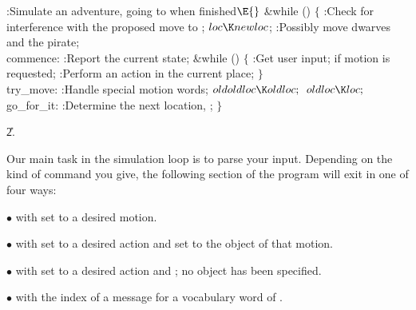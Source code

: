 \Y\B\4:Simulate an adventure, going to  when finished\X${}%
\E{}$\6
\&{while} ()\5
${}\{{}$\1\6
:Check for interference with the proposed move to \X;\6
${}\\{loc}\K\\{newloc}{}$;\6
:Possibly move dwarves and the pirate\X;\6
\4\\{commence}:\5
:Report the current state\X;\6
\&{while} ()\5
${}\{{}$\1\6
:Get user input;  if motion is requested\X;\6
:Perform an action in the current place\X;\6
\4${}\}{}$\2\6
\4\\{try\_move}:\5
:Handle special motion words\X;\6
${}\\{oldoldloc}\K\\{oldloc};{}$\6
${}\\{oldloc}\K\\{loc};{}$\6
\4\\{go\_for\_it}:\5
:Determine the next location, \X;\6
\4${}\}{}$\2\par
\U2.\fi

Our main task in the simulation loop is to parse your
input.
Depending on the kind of command you give, the following section
of the program will exit in one of four ways:

\smallskip
\item{$\bullet$}  with  set to a desired
motion.

\item{$\bullet$}  with  set to a
desired action
and  set to the object of that motion.

\item{$\bullet$}  with  set to a
desired action
and ; no object has been specified.

\item{$\bullet$}  with  the
index of a message for a vocabulary word of .

